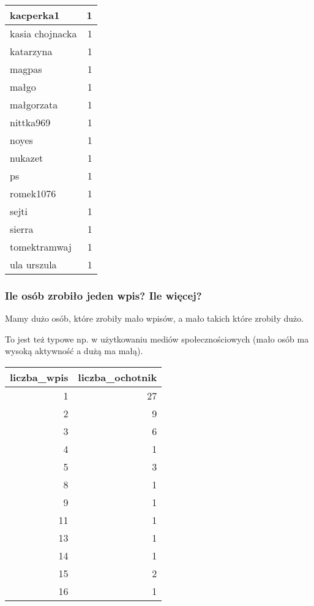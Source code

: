 \documentclass[
]{article}
\begin{document}
\begin{table}
\begin{tabular}[t]{l|r}
\hline
kacperka1 & 1\\
\hline
kasia chojnacka & 1\\
\hline
katarzyna & 1\\
\hline
magpas & 1\\
\hline
małgo & 1\\
\hline
małgorzata & 1\\
\hline
nittka969 & 1\\
\hline
noyes & 1\\
\hline
nukazet & 1\\
\hline
ps & 1\\
\hline
romek1076 & 1\\
\hline
sejti & 1\\
\hline
sierra & 1\\
\hline
tomektramwaj & 1\\
\hline
ula urszula & 1\\
\hline
\end{tabular}
\end{table}

\hypertarget{ile-osuxf3b-zrobiux142o-jeden-wpis-ile-wiux119cej}{%
\subsubsection{Ile osób zrobiło jeden wpis? Ile
więcej?}\label{ile-osuxf3b-zrobiux142o-jeden-wpis-ile-wiux119cej}}

Mamy dużo osób, które zrobiły mało wpisów, a mało takich które zrobiły
dużo.

To jest też typowe np. w użytkowaniu mediów społecznościowych (mało osób
ma wysoką aktywność a dużą ma małą).

\begin{table}
\centering
\begin{tabular}[t]{r|r}
\hline
liczba\_wpis & liczba\_ochotnik\\
\hline
1 & 27\\
\hline
2 & 9\\
\hline
3 & 6\\
\hline
4 & 1\\
\hline
5 & 3\\
\hline
8 & 1\\
\hline
9 & 1\\
\hline
11 & 1\\
\hline
13 & 1\\
\hline
14 & 1\\
\hline
15 & 2\\
\hline
16 & 1\\
\hline
\end{tabular}
\end{table}
\end{document}
